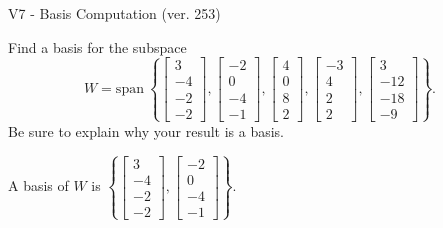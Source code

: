 \begin{exercise}
  \begin{exerciseTitle}V7 - Basis Computation (ver. 253)\end{exerciseTitle}
  \begin{exerciseStatement}
    Find a basis for the subspace 
\[W=\mathrm{span}\ \left\{\left[\begin{array}{r}
3 \\
-4 \\
-2 \\
-2
\end{array}\right] , \left[\begin{array}{r}
-2 \\
0 \\
-4 \\
-1
\end{array}\right] , \left[\begin{array}{r}
4 \\
0 \\
8 \\
2
\end{array}\right] , \left[\begin{array}{r}
-3 \\
4 \\
2 \\
2
\end{array}\right] , \left[\begin{array}{r}
3 \\
-12 \\
-18 \\
-9
\end{array}\right]\right\}.\]
 Be sure to explain why your result is a basis.


  \end{exerciseStatement}
  \begin{exerciseAnswer}
   A basis of \(W\) is  \(\left\{\left[\begin{array}{r}
3 \\
-4 \\
-2 \\
-2
\end{array}\right] , \left[\begin{array}{r}
-2 \\
0 \\
-4 \\
-1
\end{array}\right]\right\}\).
  


  \end{exerciseAnswer}
\end{exercise}